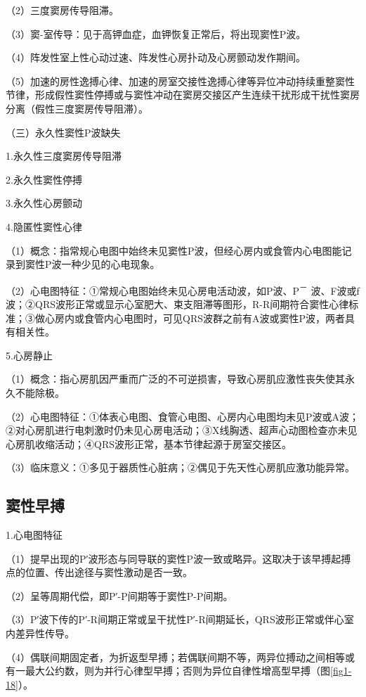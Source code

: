 （2）三度窦房传导阻滞。

（3）窦-室传导：见于高钾血症，血钾恢复正常后，将出现窦性P波。

（4）阵发性室上性心动过速、阵发性心房扑动及心房颤动发作期间。

（5）加速的房性逸搏心律、加速的房室交接性逸搏心律等异位冲动持续重整窦性节律，形成假性窦性停搏或与窦性冲动在窦房交接区产生连续干扰形成干扰性窦房分离（假性三度窦房传导阻滞）。

（三）永久性窦性P波缺失

1.永久性三度窦房传导阻滞

2.永久性窦性停搏

3.永久性心房颤动

4.隐匿性窦性心律

（1）概念：指常规心电图中始终未见窦性P波，但经心房内或食管内心电图能记录到窦性P波一种少见的心电现象。

（2）心电图特征：①常规心电图始终未见心房电活动波，如P波、P\textsuperscript{－}
波、F波或f波；②QRS波形正常或显示心室肥大、束支阻滞等图形，R-R间期符合窦性心律标准；③做心房内或食管内心电图时，可见QRS波群之前有A波或窦性P波，两者具有相关性。

5.心房静止

（1）概念：指心房肌因严重而广泛的不可逆损害，导致心房肌应激性丧失使其永久不能除极。

（2）心电图特征：①体表心电图、食管心电图、心房内心电图均未见P波或A波；②对心房肌进行电刺激时仍未见心房电活动；③X线胸透、超声心动图检查亦未见心房肌收缩活动；④QRS波形正常，基本节律起源于房室交接区。

（3）临床意义：①多见于器质性心脏病；②偶见于先天性心房肌应激功能异常。

\protect\hypertarget{text00007.htmlux5cux23subid16}{}{}

\subsection{窦性早搏}

1.心电图特征

（1）提早出现的P′波形态与同导联的窦性P波一致或略异。这取决于该早搏起搏点的位置、传出途径与窦性激动是否一致。

（2）呈等周期代偿，即P′-P间期等于窦性P-P间期。

（3）P′波下传的P′-R间期正常或呈干扰性P′-R间期延长，QRS波形正常或伴心室内差异性传导。

（4）偶联间期固定者，为折返型早搏；若偶联间期不等，两异位搏动之间相等或有一最大公约数，则为并行心律型早搏；否则为异位自律性增高型早搏（图\ref{fig1-18}）。

